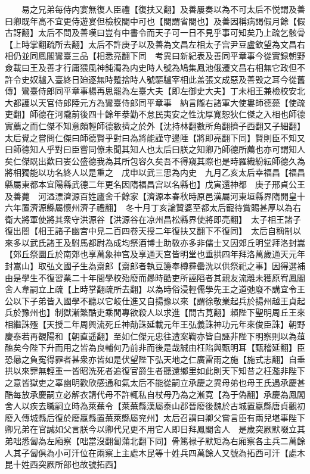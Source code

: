 　　易之兄弟每侍内宴無復人臣禮【復扶又翻】及善屢奏以為不可太后不悦謂及善曰卿既年高不宜更侍遊宴但檢校閤中可也【閤謂省閤也】及善因稱病謁假月餘【假古訝翻】太后不問及善嘆曰豈有中書令而天子可一日不見乎事可知矣乃上疏乞骸骨【上時掌翻疏所去翻】太后不許庚子以及善為文昌左相太子宫尹豆盧欽望為文昌右相仍並同鳳閣鸞臺三品【相悉亮翻下同　考異曰新紀表及善同平章事今從實録朝野僉載曰王及善才行庸猥風神鈍濁為内史時人號為鳩集鳳池俄遷文昌右相無它政但不許令史奴驢入臺終日廹逐無時蹔捨時人號驅驢宰相此盖張文成惡及善毁之耳今從舊傳】鸞臺侍郎同平章事楊再思罷為左臺大夫【即左御史大夫】丁未相王兼檢校安北大都護以天官侍郎陸元方為鸞臺侍郎同平章事　納言隴右諸軍大使婁師德薨【使疏吏翻】師德在河隴前後四十餘年㳟勤不怠民夷安之性沈厚寛恕狄仁傑之入相也師德實薦之而仁傑不知意頗輕師德數擠之於外【沈持林翻數所角翻擠子西翻又子細翻】太后覺之嘗問仁傑曰師德賢乎對曰為將能謹守邊陲【將即亮翻下同】賢則臣不知又曰師德知人乎對曰臣嘗同僚未聞其知人也太后曰朕之知卿乃師德所薦也亦可謂知人矣仁傑既出歎曰婁公盛德我為其所包容久矣吾不得窺其際也是時羅織紛紜師德久為將相獨能以功名終人以是重之　戊申以武三思為内史　九月乙亥太后幸福昌【福昌縣屬東都本宜陽縣武德二年更名因隋福昌宫以名縣也】戊寅還神都　庚子邢貞公王及善薨　河溢漂濟源百姓廬舍千餘家【濟源本春秋時原邑漢屬河東垣縣界隋開皇十六年置濟源縣屬懷州濟子禮翻】　冬十月丁亥論贊婆至都太后寵待賞賜甚厚以為右衛大將軍使將其衆守洪源谷【洪源谷在凉州昌松縣界使將即亮翻】　太子相王諸子復出閤【相王諸子幽宫中見二百四卷天授二年復扶又翻下不復同】　太后自稱制以來多以武氏諸王及駙馬都尉為成均祭酒博士助敎亦多非儒士又因郊丘明堂拜洛封嵩【郊丘祭圜丘於南郊也享萬象神宫及享通天宫皆明堂也垂拱四年拜洛萬歲通天元年封嵩山】取弘文國子生為齋郎【齋郎者執豆籩奉樽彛罍洗以供祭祀之事】因得選補由是學生不復習業二十年間學校殆廢而曏時酷吏所誣䧟者其親友流離未獲原宥鳳閣舍人韋嗣立上疏【上時掌翻疏所去翻】以為時俗浸輕儒學先王之道弛廢不講宜令王公以下子弟皆入國學不聽以它岐仕進又自揚豫以來【謂徐敬業起兵於揚州越王貞起兵於豫州也】制獄漸繁酷吏乘閒專欲殺人以求進【間古莧翻】賴陛下聖明周丘王來相繼誅殛【天授二年周興流死丘神勣誅延載元年王弘義誅神功元年來俊臣誅】朝野慶泰若再覩陽和【朝直遥翻】至如仁傑元忠往遭案鞫亦皆自誣非陛下明察則以為葅醢矣今陛下升而用之皆為良輔何乃前非而後是哉誠由枉陷與甄明耳【甄稽延翻】臣恐曏之負寃得罪者甚衆亦皆如是伏望陛下弘天地之仁廣雷雨之施【施式志翻】自垂拱以來罪無輕重一皆昭洗死者追復官爵生者聽還鄉里如此則天下知昔之枉濫非陛下之意皆獄吏之辜幽明歡欣感通和氣太后不能從嗣立承慶之異母弟也母王氏遇承慶甚酷每放承慶嗣立必解衣請代母不許輒私自杖母乃為之漸寛【為于偽翻】承慶為鳳閣舍人以疾去職嗣立時為萊蕪令【萊蕪縣漢屬泰山郡晉廢後魏於古城置嬴縣唐貞觀初廢入傳城縣后復於廢嬴縣置蕪萊縣屬兖州】太后召謂曰卿父嘗言臣有兩兒堪事陛下卿兄弟在官誠如父言朕今以卿代兄更不用它人即日拜鳳閣舍人　是歲突厥默啜立其弟咄悉匐為左廂察【咄當沒翻匐蒲北翻下同】骨篤禄子默矩為右廂察各主兵二萬餘人其子匐俱為小可汗位在兩察上主處木昆等十姓兵四萬餘人又號為拓西可汗【處木昆十姓西突厥所部也故號拓西】


